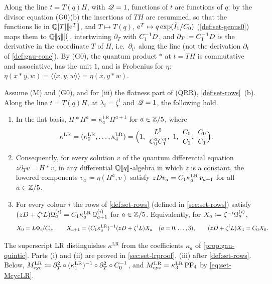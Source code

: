 
Along the line $t=T(q)H$, with $\mathscr{Q}=1$, functions of $t$ are functions of $q$: by the divisor equation (G0)(b) the insertions of $TH$ are resummed, so that the functions lie in $\mathbb{Q}[T][\![ \mathrm{e}^T ]\!]$, and $T\mapsto T(q)$, $\mathrm{e}^T\mapsto q\exp(\tilde I_1/C_0)$ (\cref{def:set-genus0}) maps them to $\mathbb{Q}[\![ q ]\!][\mathfrak{l}]$, intertwining $\partial_T$ with $C_1^{-1}D$, and $\partial_T\coloneqq C_1^{-1}D$ is the derivative in the coordinate $T$ of $H$, i.e.\ $\partial_{t^1}$ along the line (not the derivation $\partial_t$ of \cref{def:gau-conc}). By (G0), the quantum product $*$ at $t=TH$ is commutative and associative, has the unit $1$, and is Frobenius for $\eta$: $\eta(x*y,w)=\langle\!\langle x,y,w\rangle\!\rangle=\eta(x,y*w)$.

\begin{prop}
\label{prop:set-cyclicLR}
Assume (M) and (G0), and for (iii) the flatness part of (QRR), \cref{def:set-rows}~(b). Along the line $t=T(q)H$, at $\lambda_i=\zeta^i$ and $\mathscr{Q}=1$, the following hold.
\begin{enumerate}
\item In the flat basis, $H*H^a=\kappa^{\mathrm{LR}}_aH^{a+1}$ for $a\in\mathbb{Z}/5$, where
\[
\kappa^{\mathrm{LR}}=(\kappa^{\mathrm{LR}}_0,\dots,\kappa^{\mathrm{LR}}_4)=\Bigl(1,\ \frac{L^5}{C_0^2C_1^3},\ 1,\ \frac{C_0}{C_1},\ \frac{C_0}{C_1}\Bigr).
\]
\item Consequently, for every solution $v$ of the quantum differential equation $z\partial_Tv=H*v$, in any differential $\mathbb{Q}[\![ q ]\!]$-algebra in which $z$ is a constant, the lowered components $v_a\coloneqq\eta(H^a,v)$ satisfy $zD v_a=C_1\kappa^{\mathrm{LR}}_a\,v_{a+1}$ for all $a\in\mathbb{Z}/5$.
\item For every colour $i$ the rows of \cref{def:set-rows} (defined in \cref{sec:set-rows}) satisfy $(zD+\zeta^iL)\mathcal{Q}^{(i)}_a=C_1\kappa^{\mathrm{LR}}_a\,\mathcal{Q}^{(i)}_{a+1}$ for $a\in\mathbb{Z}/5$. Equivalently, for $X_a\coloneqq\zeta^{-i}\mathcal{Q}^{(i)}_a$,
\[
X_0=L\Phi_i/C_0,\qquad X_{a+1}=(C_1\kappa^{\mathrm{LR}}_a)^{-1}(zD+\zeta^iL)X_a\quad(a=0,\dots,3),\qquad(zD+\zeta^iL)X_4=C_0X_0 .
\]
\end{enumerate}
\end{prop}

The superscript LR distinguishes $\kappa^{\mathrm{LR}}$ from the coefficients $\kappa_a$ of \cref{prop:gau-quintic}. Parts (i) and (ii) are proved in \cref{sec:set-lrproof}, (iii) after \cref{def:set-rows}. Below, $M_{\mathrm{cyc}}^{\mathrm{LR}}\coloneqq\partial_T^2\circ(\kappa^{\mathrm{LR}}_1)^{-1}\circ\partial_T^2\circ C_0^{-1}$, and $M_{\mathrm{cyc}}^{\mathrm{LR}}=\kappa^{\mathrm{LR}}_3\,\mathrm{PF}_{4}$ by \eqref{eq:set-McycLR}.


